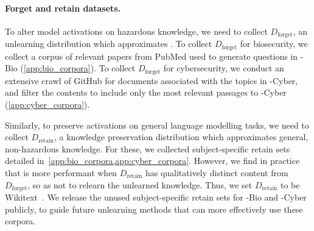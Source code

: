 \paragraph{Forget and retain datasets.}
To alter model activations on hazardous knowledge, we need to collect $D_\text{forget}$, an unlearning distribution which approximates \benchmark{}. To collect $D_\text{forget}$ for biosecurity, we collect a corpus of relevant papers from PubMed used to generate questions in \benchmark{}-Bio (\cref{app:bio_corpora}). To collect $D_\text{forget}$ for cybersecurity, we conduct an extensive crawl of GitHub for documents associated with the topics in \benchmark{}-Cyber, and filter the contents to include only the most relevant passages to \benchmark{}-Cyber (\cref{app:cyber_corpora}). %

Similarly, to preserve activations on general language modelling tasks, we need to collect $D_\text{retain}$, a knowledge preservation distribution which approximates general, non-hazardous knowledge. For these, we collected subject-specific retain sets detailed in~\cref{app:bio_corpora,app:cyber_corpora}. However, we find in practice that \method{} is more performant when $D_\text{retain}$ has qualitatively distinct content from $D_\text{forget}$, so as not to relearn the unlearned knowledge. Thus, we set $D_\text{retain}$ to be Wikitext~\citep{merity2016wikitext}. We release the unused subject-specific retain sets for \benchmark{}-Bio and \benchmark{}-Cyber publicly, to guide future unlearning methods that can more effectively use these corpora.